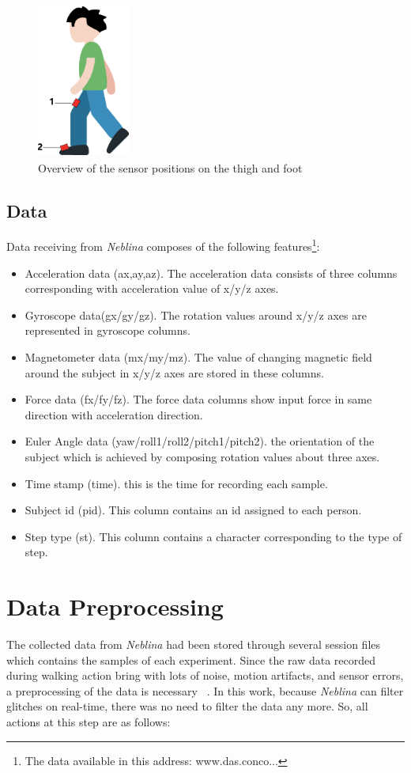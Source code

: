 \begin{figure}
\includegraphics[height=2.0in, width=1.2in]{sensorPosition.eps}
\caption{Overview of the sensor positions on the thigh and foot}
\label{senPosition}
\end{figure}

\subsection{Data}
Data receiving from \textit{Neblina} composes of the following features\footnote{The data available in this address: www.das.conco...}:

\begin{itemize}
\item Acceleration data (ax,ay,az). The acceleration data consists of three columns corresponding with acceleration value of x/y/z axes.
\item Gyroscope data(gx/gy/gz). The rotation values around x/y/z axes are represented in gyroscope columns.
\item Magnetometer data (mx/my/mz). The value of changing magnetic field around the subject in x/y/z axes are stored in these columns.
\item Force data (fx/fy/fz). The force data columns show input force in same direction with acceleration direction.
\item Euler Angle data (yaw/roll1/roll2/pitch1/pitch2). the orientation of the subject which is achieved by composing rotation values about three axes.
\item Time stamp (time). this is the time for recording each sample.
\item Subject id (pid). This column contains an id assigned to each person.
\item Step type (st). This column contains a character corresponding to the type of step.
\end{itemize}


\section{Data Preprocessing}
The collected data from \textit{Neblina} had been stored through several session files which contains the samples of each experiment.
Since the raw data recorded during walking action bring with lots of noise, motion artifacts, and sensor errors, a preprocessing of the data is necessary ~\cite{s131217472}. In this work, because \textit{Neblina} can filter glitches on real-time, there was no need to filter the data any more. So, all actions at this step are as follows:

